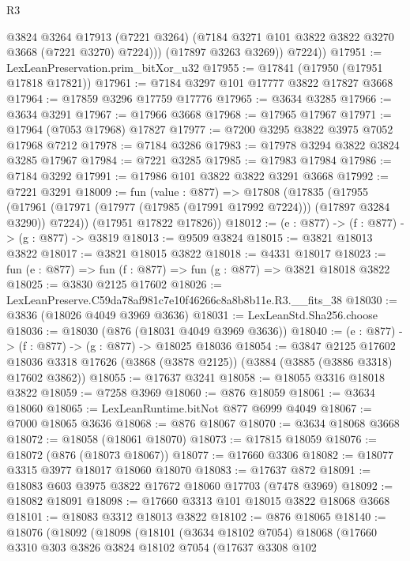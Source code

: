 \begin{lexlean}{R3}
\begin{coremodule}
              @3824
              @3264
              @17913
              (@7221 @3264)
              (@7184 @3271 @101 @3822 @3822 @3270 @3668 (@7221 @3270) @7224)))
          (@17897 @3263 @3269))
        @7224))
@17951 := LexLeanPreservation.prim_bitXor_u32
@17955 := @17841 (@17950 (@17951 @17818 @17821))
@17961 := @7184 @3297 @101 @17777 @3822 @17827 @3668
@17964 := @17859 @3296 @17759 @17776
@17965 := @3634 @3285
@17966 := @3634 @3291
@17967 := @17966 @3668
@17968 := @17965 @17967
@17971 := @17964 (@7053 @17968) @17827
@17977 := @7200 @3295 @3822 @3975 @7052 @17968 @7212
@17978 := @7184 @3286
@17983 := @17978 @3294 @3822 @3824 @3285 @17967
@17984 := @7221 @3285
@17985 := @17983 @17984
@17986 := @7184 @3292
@17991 := @17986 @101 @3822 @3822 @3291 @3668
@17992 := @7221 @3291
@18009 := fun (value : @877) =>
  @17808
    (@17835
      (@17955 (@17961 (@17971 (@17977 (@17985 (@17991 @17992 @7224))) (@17897 @3284 @3290)) @7224))
      (@17951 @17822 @17826))
@18012 := (e : @877) -> (f : @877) -> (g : @877) -> @3819
@18013 := @9509 @3824
@18015 := @3821 @18013 @3822
@18017 := @3821 @18015 @3822
@18018 := @4331 @18017
@18023 := fun (e : @877) => fun (f : @877) => fun (g : @877) => @3821 @18018 @3822
@18025 := @3830 @2125 @17602
@18026 := LexLeanPreserve.C59da78af981c7e10f46266c8a8b8b11e.R3.__fits_38
@18030 := @3836 (@18026 @4049 @3969 @3636)
@18031 := LexLeanStd.Sha256.choose
@18036 := @18030 (@876 (@18031 @4049 @3969 @3636))
@18040 := (e : @877) -> (f : @877) -> (g : @877) -> @18025 @18036
@18054 := @3847
    @2125
    @17602
    @18036
    @3318
    @17626
    (@3868 (@3878 @2125))
    (@3884 (@3885 (@3886 @3318) @17602 @3862))
@18055 := @17637 @3241
@18058 := @18055 @3316 @18018 @3822
@18059 := @7258 @3969
@18060 := @876 @18059
@18061 := @3634 @18060
@18065 := LexLeanRuntime.bitNot @877 @6999 @4049
@18067 := @7000 @18065 @3636
@18068 := @876 @18067
@18070 := @3634 @18068 @3668
@18072 := @18058 (@18061 @18070)
@18073 := @17815 @18059
@18076 := @18072 (@876 (@18073 @18067))
@18077 := @17660 @3306
@18082 := @18077 @3315 @3977 @18017 @18060 @18070
@18083 := @17637 @872
@18091 := @18083 @603 @3975 @3822 @17672 @18060 @17703 (@7478 @3969)
@18092 := @18082 @18091
@18098 := @17660 @3313 @101 @18015 @3822 @18068 @3668
@18101 := @18083 @3312 @18013 @3822
@18102 := @876 @18065
@18140 := @18076
    (@18092
      (@18098
        (@18101
          (@3634 @18102 @7054)
          @18068
          (@17660
            @3310
            @303
            @3826
            @3824
            @18102
            @7054
            (@17637
              @3308
              @102

\end{coremodule}
\end{lexlean}
